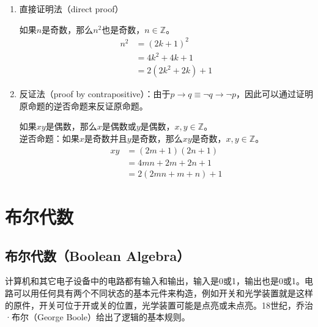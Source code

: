 \documentclass[12pt, openany, oneside]{book}
\begin{document}
\begin{enumerate}
	\item 直接证明法（direct proof）

	      \begin{tcolorbox}\nonumber
		      如果$ n $是奇数，那么$ n^2 $也是奇数，$ n \in \mathbb{Z} $。
		      \begin{align}
			      n^2 & = (2k + 1)^2       \\
			          & = 4k^2 + 4k + 1    \\
			          & = 2(2k^2 + 2k) + 1
		      \end{align}
	      \end{tcolorbox}

	\item 反证法（proof by contrapositive）：由于$ p \rightarrow q \equiv \neg q \rightarrow \neg p $，因此可以通过证明原命题的逆否命题来反证原命题。

	      \begin{tcolorbox}\nonumber
		      如果$ xy $是偶数，那么$ x $是偶数或$ y $是偶数，$ x, y \in \mathbb{Z} $。 \\
		      逆否命题：如果$ x $是奇数并且$ y $是奇数，那么$ xy $是奇数，$ x, y \in \mathbb{Z} $。
		      \begin{align}
			      xy & = (2m + 1)(2n + 1)   \\
			         & = 4mn + 2m +2n + 1   \\
			         & = 2(2mn + m + n) + 1
		      \end{align}
	      \end{tcolorbox}
\end{enumerate}

\newpage

\section{布尔代数}

\subsection{布尔代数（Boolean Algebra）}

计算机和其它电子设备中的电路都有输入和输出，输入是0或1，输出也是0或1。电路可以用任何具有两个不同状态的基本元件来构造，例如开关和光学装置就是这样的原件，开关可位于开或关的位置，光学装置可能是点亮或未点亮。18世纪，乔治·布尔（George Boole）给出了逻辑的基本规则。 \\
\end{document}
